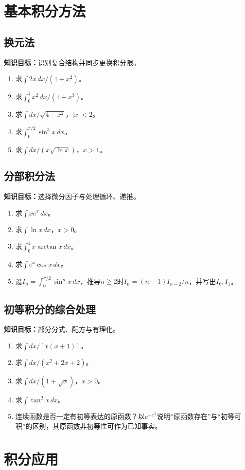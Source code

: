 \documentclass[11pt,a4paper,fontset=fandol]{ctexrep}
\newcommand{\goal}[1]{\textbf{知识目标：}#1\par}
\begin{document}
\section{基本积分方法}
\subsection{换元法}
\goal{识别复合结构并同步更换积分限。}
\begin{enumerate}
\item 求$\int 2x\,dx/(1+x^2)$。
\item 求$\int_0^1 x^2\,dx/(1+x^3)$。
\item 求$\int dx/\sqrt{4-x^2}$，$|x|<2$。
\item 求$\int_0^{\pi/2}\sin^3x\,dx$。
\item 求$\int dx/(x\sqrt{\ln x})$，$x>1$。
\end{enumerate}
\subsection{分部积分法}
\goal{选择微分因子与处理循环、递推。}
\begin{enumerate}
\item 求$\int xe^x\,dx$。
\item 求$\int\ln x\,dx$，$x>0$。
\item 求$\int_0^1x\arctan x\,dx$。
\item 求$\int e^x\cos x\,dx$。
\item 设$I_n=\int_0^{\pi/2}\sin^nx\,dx$，推导$n\ge2$时$I_n=(n-1)I_{n-2}/n$，并写出$I_0,I_1$。
\end{enumerate}
\subsection{初等积分的综合处理}
\goal{部分分式、配方与有理化。}
\begin{enumerate}
\item 求$\int dx/[x(x+1)]$。
\item 求$\int dx/(x^2+2x+2)$。
\item 求$\int dx/(1+\sqrt x)$，$x>0$。
\item 求$\int\tan^2x\,dx$。
\item 连续函数是否一定有初等表达的原函数？以$e^{-x^2}$说明“原函数存在”与“初等可积”的区别，其原函数非初等性可作为已知事实。
\end{enumerate}
\section{积分应用}
\end{document}
